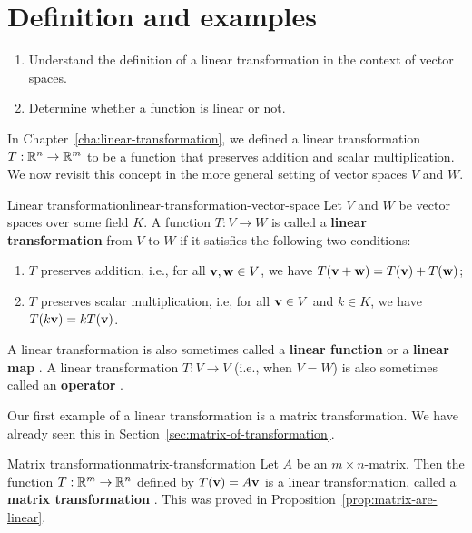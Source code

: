 \section{Definition and examples}

\begin{outcome}
  \begin{enumerate}
  \item Understand the definition of a linear transformation in the
    context of vector spaces.
  \item Determine whether a function is linear or not.
  \end{enumerate}
\end{outcome}

In Chapter~\ref{cha:linear-transformation}, we defined a linear
transformation $T:\mathbb{R}^n\to\mathbb{R}^m$ to be a function that preserves
addition and scalar multiplication. We now revisit this concept in the
more general setting of vector spaces $V$ and $W$.

\begin{definition}{Linear transformation}{linear-transformation-vector-space}
  Let $V$ and $W$ be vector spaces over some field $K$. A function
  $T: V \to W$ is called a \textbf{linear transformation}%
   from $V$ to $W$ if
  it satisfies the following two conditions:
  \begin{enumerate}
  \item $T$ preserves addition, i.e., for all\/
    $\vect{v},\vect{w}\in V$, we have
    $T(\vect{v}+\vect{w}) = T(\vect{v}) + T(\vect{w})$;
  \item $T$ preserves scalar multiplication, i.e, for all\/
    $\vect{v}\in V$ and $k\in K$, we have
    $T(k\vect{v}) = kT(\vect{v})$.
  \end{enumerate}
  A linear transformation is also sometimes called a \textbf{linear
    function}%
   or a
  \textbf{linear map}%
  . A linear
  transformation $T:V\to V$ (i.e., when $V=W$) is also sometimes
  called an \textbf{operator}%
  .
\end{definition}

Our first example of a linear transformation is a matrix
transformation. We have already seen this in
Section~\ref{sec:matrix-of-transformation}.

\begin{example}{Matrix transformation}{matrix-transformation}
  Let $A$ be an $m\times n$-matrix. Then the function $T:\mathbb{R}^m\to\mathbb{R}^n$
  defined by $T(\vect{v})=A\vect{v}$ is a linear transformation,
  called a \textbf{matrix transformation}%
  . This was proved in
  Proposition~\ref{prop:matrix-are-linear}.
\end{example}

